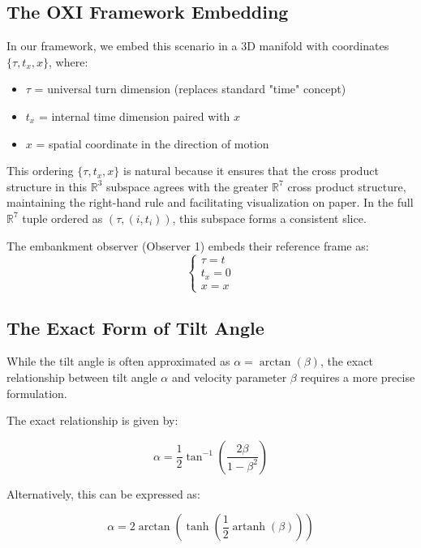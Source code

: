 \documentclass{article}
\DeclareMathOperator{\artanh}{artanh}
\begin{document}
\subsection{The OXI Framework Embedding}

In our framework, we embed this scenario in a 3D manifold with coordinates $\{\tau, t_x, x\}$, where:
\begin{itemize}
\item $\tau$ = universal turn dimension (replaces standard "time" concept)
\item $t_x$ = internal time dimension paired with $x$
\item $x$ = spatial coordinate in the direction of motion
\end{itemize}

This ordering $\{\tau, t_x, x\}$ is natural because it ensures that the cross product structure in this $\mathbb{R}^3$ subspace agrees with the greater $\mathbb{R}^7$ cross product structure, maintaining the right-hand rule and facilitating visualization on paper. In the full $\mathbb{R}^7$ tuple ordered as $(\tau, (i, t_i))$, this subspace forms a consistent slice.

The embankment observer (Observer 1) embeds their reference frame as:
\begin{equation}
\begin{cases}
\tau = t \\
t_x = 0 \\
x = x
\end{cases}
\end{equation}

\subsection{The Exact Form of Tilt Angle}

While the tilt angle is often approximated as $\alpha = \arctan(\beta)$, the exact relationship between tilt angle $\alpha$ and velocity parameter $\beta$ requires a more precise formulation.

The exact relationship is given by:

\begin{equation}
\alpha = \frac{1}{2}\tan^{-1}\left(\frac{2\beta}{1-\beta^2}\right)
\end{equation}

Alternatively, this can be expressed as:

\begin{equation}
\alpha = 2\arctan\left(\tanh\left(\frac{1}{2}\artanh(\beta)\right)\right)
\end{equation}
\end{document}
